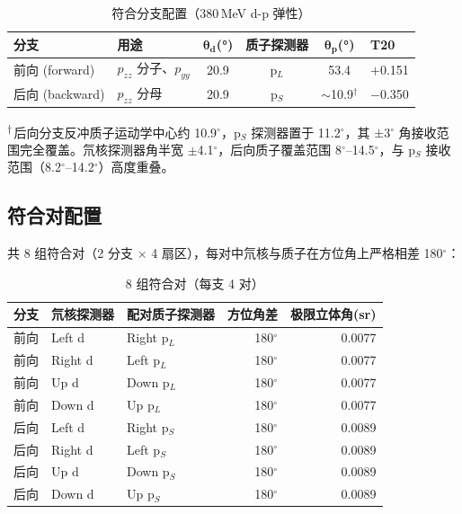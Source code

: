 \documentclass[UTF8,10pt,letterpaper,fontset=none]{ctexart}
\begin{document}
\begin{table}[h]
\centering
\sffamily\small
\caption{符合分支配置（380\,MeV d-p 弹性）}
\label{tab:branches}
\renewcommand{\arraystretch}{1.25}
\begin{tabular}{ll ccc l}
\toprule
\textbf{分支} & \textbf{用途} & $\boldsymbol{\theta_d}$(°) & \textbf{质子探测器} & $\boldsymbol{\theta_p}$(°) & \textbf{T20} \\
\midrule
\rowcolor{SheetLight}
前向 (forward) & $p_{zz}$ 分子、$p_{yy}$ & 20.9 & p$_L$ & 53.4 & $+$0.151 \\
\rowcolor{SheetAmber!50}
后向 (backward) & $p_{zz}$ 分母 & 20.9 & p$_S$ & $\sim$10.9$^\dagger$ & $-$0.350 \\
\bottomrule
\end{tabular}
\end{table}

\noindent\textsuperscript{$\dagger$}\,后向分支反冲质子运动学中心约 10.9$^\circ$，p$_S$ 探测器置于 11.2$^\circ$，其 $\pm$3$^\circ$ 角接收范围完全覆盖。氘核探测器角半宽 $\pm$4.1$^\circ$，后向质子覆盖范围 8$^\circ$--14.5$^\circ$，与 p$_S$ 接收范围（8.2$^\circ$--14.2$^\circ$）高度重叠。

\subsection{符合对配置}

共 8 组符合对（2 分支 $\times$ 4 扇区），每对中氘核与质子在方位角上严格相差 180$^\circ$：

\begin{table}[h]
\centering
\sffamily\small
\caption{8 组符合对（每支 4 对）}
\label{tab:coincidence}
\renewcommand{\arraystretch}{1.15}
\begin{tabular}{lll rr}
\toprule
\textbf{分支} & \textbf{氘核探测器} & \textbf{配对质子探测器} & \textbf{方位角差} & \textbf{极限立体角}(sr) \\
\midrule
前向 & Left d  & Right p$_L$  & 180$^\circ$ & 0.0077 \\
前向 & Right d & Left p$_L$   & 180$^\circ$ & 0.0077 \\
前向 & Up d    & Down p$_L$   & 180$^\circ$ & 0.0077 \\
前向 & Down d  & Up p$_L$     & 180$^\circ$ & 0.0077 \\
\midrule
后向 & Left d  & Right p$_S$  & 180$^\circ$ & 0.0089 \\
后向 & Right d & Left p$_S$   & 180$^\circ$ & 0.0089 \\
后向 & Up d    & Down p$_S$   & 180$^\circ$ & 0.0089 \\
后向 & Down d  & Up p$_S$     & 180$^\circ$ & 0.0089 \\
\bottomrule
\end{tabular}
\end{table}
\end{document}
